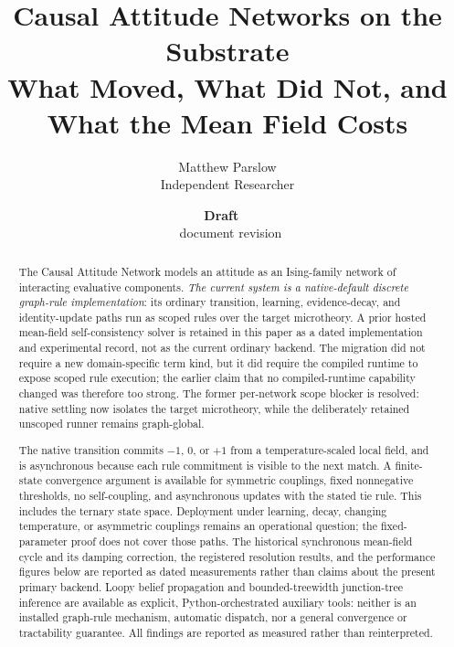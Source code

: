 \documentclass[11pt,a4paper]{article}
\title{Causal Attitude Networks on the Substrate\\\large What Moved, What Did Not, and What the Mean Field Costs}
\author{Matthew Parslow\\Independent Researcher}
\date{\textbf{Draft \textemdash\ \PaperDraft}\\[2pt]\PaperDisplayDate \textbullet\ document revision \PaperRevision}
\theoremstyle{remark}
\begin{document}
\maketitle
\begin{center}
\end{center}
\vspace{1em}

\begin{abstract}
The Causal Attitude Network \citep{dalege2016} models an attitude as an Ising-family network of
interacting evaluative components. \emph{The current system is a native-default discrete graph-rule
implementation}: its ordinary transition, learning, evidence-decay, and identity-update paths run as
scoped rules over the target microtheory. A prior hosted mean-field self-consistency solver is retained
in this paper as a dated implementation and experimental record, not as the current ordinary backend.
The migration did not require a new domain-specific term kind, but it did require the compiled runtime
to expose scoped rule execution; the earlier claim that no compiled-runtime capability changed was
therefore too strong. The former per-network scope blocker is resolved: native settling now isolates
the target microtheory, while the deliberately retained unscoped runner remains graph-global.

The native transition commits $-1$, $0$, or $+1$ from a temperature-scaled local field, and is
asynchronous because each rule commitment is visible to the next match. A finite-state convergence argument is available for symmetric couplings, fixed nonnegative thresholds, no self-coupling, and asynchronous updates with the stated tie rule. This includes the ternary state space. Deployment under learning, decay, changing temperature, or asymmetric couplings remains an operational question; the fixed-parameter proof does not cover those paths.
The historical synchronous mean-field cycle and its damping correction, the registered resolution
results, and the performance figures below are reported as dated measurements rather than claims about
the present primary backend. Loopy belief propagation and bounded-treewidth junction-tree inference
are available as explicit, Python-orchestrated auxiliary tools: neither is an installed graph-rule
mechanism, automatic dispatch, nor a general convergence or tractability guarantee. All findings are
reported as measured rather than reinterpreted.
\end{abstract}
\end{document}
